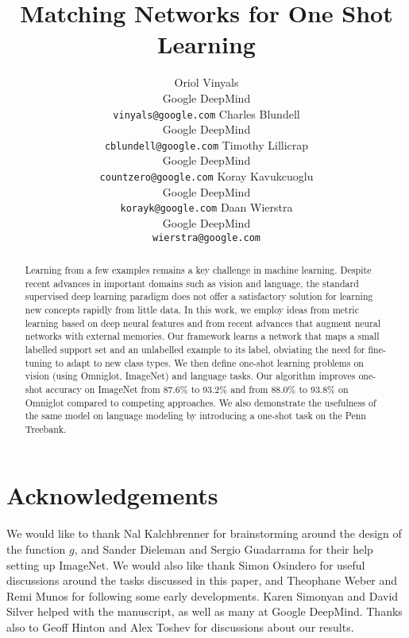\documentclass{article}
\title{Matching Networks for One Shot Learning}
\author{
  Oriol Vinyals \\
  Google DeepMind \\ 
  \texttt{vinyals@google.com}
  \And
  Charles Blundell \\
  Google DeepMind \\
  \texttt{cblundell@google.com}
  \And
  Timothy Lillicrap \\
  Google DeepMind \\
  \texttt{countzero@google.com}
  \AND
  Koray Kavukcuoglu \\
  Google DeepMind \\
  \texttt{korayk@google.com}
  \And
  Daan Wierstra \\
  Google DeepMind \\
  \texttt{wierstra@google.com}
}
\begin{document}

\maketitle

\begin{abstract}
Learning from a few examples remains a key challenge in machine learning. Despite recent advances in important domains such as vision and language, the standard supervised deep learning paradigm does not offer a satisfactory solution for learning new concepts rapidly from little data. In this work, we employ ideas from metric learning based on deep neural features and from recent advances that augment neural networks with external memories. Our framework learns a network that maps a small labelled support set and an unlabelled example to its label, obviating the need for fine-tuning to adapt to new class types. We then define one-shot learning problems on vision (using Omniglot, ImageNet) and language tasks. Our algorithm improves one-shot accuracy on ImageNet from 87.6\% to 93.2\% and from 88.0\% to 93.8\% on Omniglot compared to competing approaches. We also demonstrate the usefulness of the same model on language modeling by introducing a one-shot task on the Penn Treebank.
\end{abstract}







\section*{Acknowledgements}
We would like to thank Nal Kalchbrenner for brainstorming around the design of the function $g$, and Sander Dieleman and Sergio Guadarrama for their help setting up ImageNet. We would also like thank Simon Osindero for useful discussions around the tasks discussed in this paper, and Theophane Weber and Remi Munos for following some early developments. Karen Simonyan and David Silver helped with the manuscript, as well as many at Google DeepMind. Thanks also to Geoff Hinton and Alex Toshev for discussions about our results.

{\small
\setlength{\bibsep}{0pt plus 1pt}

}


\end{document}
